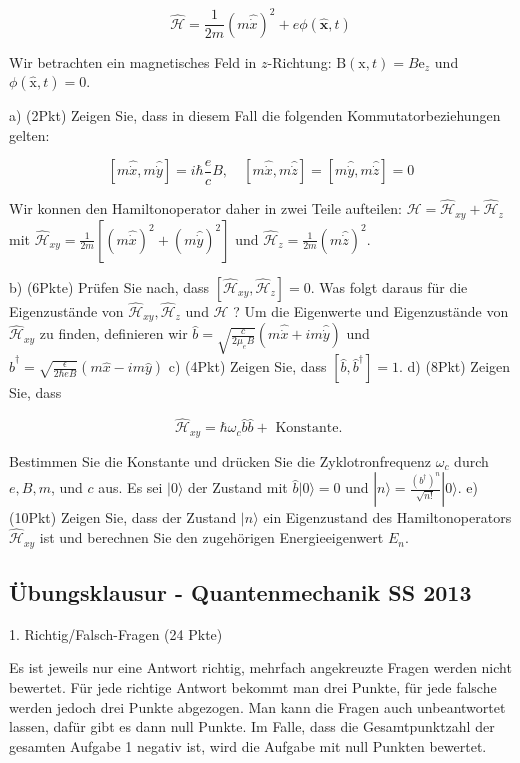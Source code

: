 \documentclass[11pt,a4paper]{article}
\begin{document}
$$
\hat{\mathcal{H}}=\frac{1}{2 m}(m \hat{\dot{x}})^2+e \phi(\hat{\mathbf{x}}, t)
$$


Wir betrachten ein magnetisches Feld in $z$-Richtung: $\mathrm{B}(\mathrm{x}, t)=B \mathrm{e}_z$ und $\phi(\hat{\mathrm{x}}, t)=0$.

a) (2Pkt) Zeigen Sie, dass in diesem Fall die folgenden Kommutatorbeziehungen gelten:

$$
[m \hat{\dot{x}}, m \hat{\dot{y}}]=i \hbar \frac{e}{c} B, \quad[m \hat{\dot{x}}, m \hat{\dot{z}}]=[m \hat{\dot{y}}, m \hat{\dot{z}}]=0
$$


Wir konnen den Hamiltonoperator daher in zwei Teile aufteilen: $\mathcal{H}=\hat{\mathcal{H}}_{x y}+\hat{\mathcal{H}}_z$ mit $\hat{\mathcal{H}}_{x y}=\frac{1}{2 m}\left[(m \hat{\dot{x}})^2+(m \hat{\dot{y}})^2\right]$ und $\hat{\mathcal{H}}_z=\frac{1}{2 m}(m \hat{\dot{z}})^2$.


b) (6Pkte) Prüfen Sie nach, dass $\left[\hat{\mathcal{H}}_{x y}, \hat{\mathcal{H}}_z\right]=0$. Was folgt daraus für die Eigenzustände von $\hat{\mathcal{H}}_{x y}, \hat{\mathcal{H}}_z$ und $\mathcal{H}$ ? Um die Eigenwerte und Eigenzustände von $\hat{\mathcal{H}}_{x y}$ zu finden, definieren wir $\hat{b}=\sqrt{\frac{c}{2 \mu_e B}}(m \hat{\dot{x}}+i m \hat{\dot{y}})$ und $\hat{b}^{\dagger}= \sqrt{\frac{\epsilon}{2 \hbar e B}}(m \hat{x}-i m \hat{y})$
c) (4Pkt) Zeigen Sie, dass $\left[\hat{b}, \hat{b}^{\dagger}\right]=1$.
d) (8Pkt) Zeigen Sie, dass

$$
\hat{\mathcal{H}}_{x y}=\hbar \omega_c \hat{b} \hat{b}+\text { Konstante. }
$$


Bestimmen Sie die Konstante und drücken Sie die Zyklotronfrequenz $\omega_c$ durch $e, B, m$, und $c$ aus.
Es sei $|0\rangle$ der Zustand mit $\hat{b}|0\rangle=0$ und $|n\rangle=\frac{\left(b^{\dagger}\right)^n}{\sqrt{n!}}|0\rangle$.
e) (10Pkt) Zeigen Sie, dass der Zustand $|n\rangle$ ein Eigenzustand des Hamiltonoperators $\hat{\mathcal{H}}_{x y}$ ist und berechnen Sie den zugehörigen Energieeigenwert $E_n$.



\pagebreak


\subsection{Übungsklausur - Quantenmechanik SS 2013}

1. Richtig/Falsch-Fragen (24 Pkte)

Es ist jeweils nur eine Antwort richtig, mehrfach angekreuzte Fragen werden nicht bewertet. Für jede richtige Antwort bekommt man drei Punkte, für jede falsche werden jedoch drei Punkte abgezogen. Man kann die Fragen auch unbeantwortet lassen, dafür gibt es dann null Punkte. Im Falle, dass die Gesamtpunktzahl der gesamten Aufgabe 1 negativ ist, wird die Aufgabe mit null Punkten bewertet.
\end{document}
